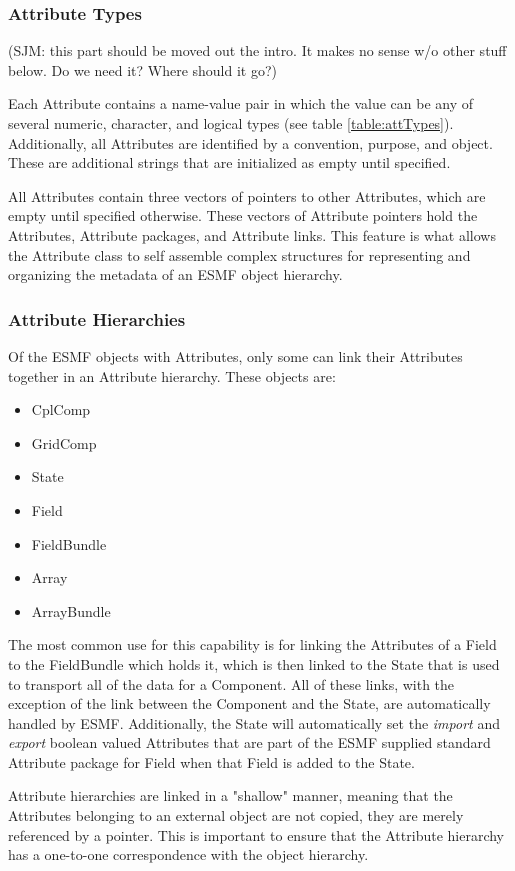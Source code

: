 \subsubsection{Attribute Types}

(SJM: this part should be moved out the intro. It makes no sense w/o other stuff below. Do we need it?  Where should it go?)


Each Attribute contains a name-value pair in which the value can be any of several numeric, character, and logical types (see table \ref{table:attTypes}). Additionally, all Attributes are identified by a convention, purpose, and object. These are additional strings that are initialized as empty until specified. 

All Attributes contain three vectors of pointers to other Attributes, which are empty until specified otherwise.  These vectors of Attribute pointers hold the Attributes, Attribute packages, and Attribute links.  This feature is what allows the Attribute class to self assemble complex structures for representing and organizing the metadata of an ESMF object hierarchy.

\subsubsection{Attribute Hierarchies}

Of the ESMF objects with Attributes, only some can link their Attributes together in an Attribute hierarchy.  These objects are:

\begin{itemize}
\item CplComp
\item GridComp
\item State
\item Field
\item FieldBundle
\item Array
\item ArrayBundle
\end{itemize}

The most common use for this capability is for linking the Attributes of a Field to the FieldBundle which holds it, which is then linked to the State that is used to transport all of the data for a Component.  All of these links, with the exception of the link between the Component and the State, are automatically handled by ESMF. Additionally, the State will automatically set the {\it import} and {\it export} boolean valued Attributes that are part of the ESMF supplied standard Attribute package for Field when that Field is added to the State. 

Attribute hierarchies are linked in a "shallow" manner, meaning that the Attributes belonging to an external object are not copied, they are merely referenced by a pointer.  This is important to ensure that the Attribute hierarchy has a one-to-one correspondence with the object hierarchy.  
